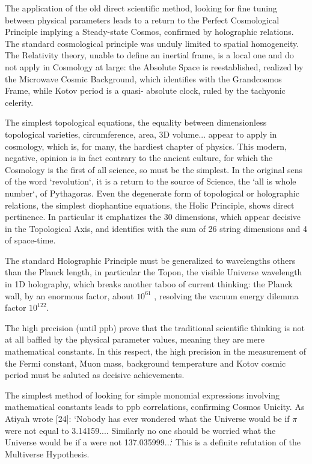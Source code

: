 \documentclass[twoside,draft]{article}
\begin{document}
\begin{sloppypar}
{The application of the old direct scientific method, looking for fine tuning between physical
parameters leads to a return to the Perfect Cosmological Principle implying a Steady-state Cosmos,
confirmed by holographic relations. The standard cosmological principle was unduly limited to
spatial homogeneity. The Relativity theory, unable to define an inertial frame, is a local one and do
not apply in Cosmology at large: the Absolute Space is reestablished, realized by the Microwave
Cosmic Background, which identifies with the Grandcosmos Frame, while Kotov period is a quasi-
absolute clock, ruled by the tachyonic celerity.

The simplest topological equations, the equality between dimensionless topological varieties,
circumference, area, 3D volume... appear to apply in cosmology, which is, for many, the hardiest
chapter of physics. This modern, negative, opinion is in fact contrary to the ancient culture, for
which the Cosmology is the first of all science, so must be the simplest. In the original sens of the
word `revolution`, it is a return to the source of Science, the `all is whole number`, of Pythagoras.
Even the degenerate form of topological or holographic relations, the simplest diophantine
equations, the Holic Principle, shows direct pertinence. In particular it emphatizes the 30
dimensions, which appear decisive in the Topological Axis, and identifies with the sum of 26 string
dimensions and 4 of space-time.

The standard Holographic Principle must be generalized to wavelengths others than the Planck
length, in particular the Topon, the visible Universe wavelength in 1D holography, which breaks
another taboo of current thinking: the Planck wall, by an enormous factor, about $10^{61}$ , resolving the
vacuum energy dilemma factor $10^{122}$.

The high precision (until ppb) prove that the traditional scientific thinking is not at all baffled by
the physical parameter values, meaning they are mere mathematical constants. In this respect, the
high precision in the measurement of the Fermi constant, Muon mass, background temperature and
Kotov cosmic period must be saluted as decisive achievements.

The simplest method of looking for simple monomial expressions involving mathematical
constants leads to ppb correlations, confirming Cosmos Unicity. As Atiyah wrote [24]: `Nobody has
ever wondered what the Universe would be if $\pi$ were not equal to 3.14159.... Similarly no one
should be worried what the Universe would be if a were not 137.035999...` This is a definite
refutation of the Multiverse Hypothesis.

}
\end{sloppypar}
\end{document}
